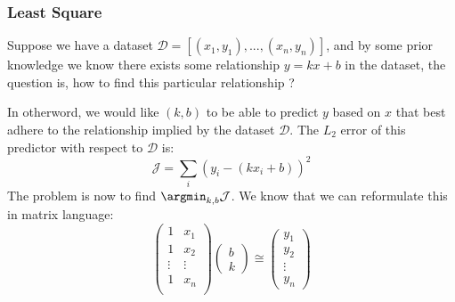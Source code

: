 \subsubsection{Least Square}

Suppose we have a dataset $\mathcal D = [(x_1,y_1),...,(x_n, y_n)]$, and by some prior knowledge we know there exists some relationship $y=kx + b$ in the dataset, the question is, how to find this particular relationship ?

In otherword, we would like $(k,b)$ to be able to predict $y$ based on $x$ that best adhere to the relationship implied by the dataset $\mathcal D$. The $L_2$ error of this predictor with respect to $\mathcal D$ is:
\begin{equation}
\mathcal J =\sum_i (y_i-(kx_i+b))^2
\end{equation}
The problem is now to find $\argmin_{k,b} \mathcal J$. We know that we can reformulate this in matrix language:
\begin{equation}
\begin{pmatrix}
1 & x_1 \\
1 & x_2 \\
\vdots &\vdots \\
1 & x_n \\
\end{pmatrix}
\begin{pmatrix}
b \\ k
\end{pmatrix}
\cong 
\begin{pmatrix}
y_1 \\
y_2 \\
\vdots \\
y_n
\end{pmatrix}
\end{equation}